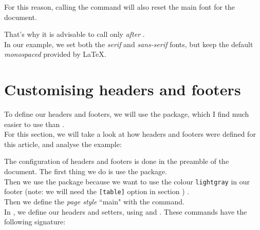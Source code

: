 For this reason, calling the  command will also reset the main font for the document.

That's why it is advisable to call  only \emph{after} . \\

In our example, we set both the \emph{serif} and \emph{sans-serif} fonts, but keep the default \emph{monospaced} provided by \LaTeX. \\
 



\section{Customising headers and footers} \label{headers-footers}

To define our headers and footers, we will use the  package, which I find much easier to use than . \\

For this section, we will take a look at how headers and footers were defined for this article, and analyse the example:



\bigskip

The configuration of headers and footers is done in the preamble of the document. The first thing we do is use the  package. \\

Then we use the  package because we want to use the colour \texttt{lightgray} in our footer (note: we will need the \texttt{[table]} option in section \emph{}) . \\

Then we define the \emph{page style} ``main" with the  command. \\

In , we define our headers and setters, using  and . These commands have the following signature:

